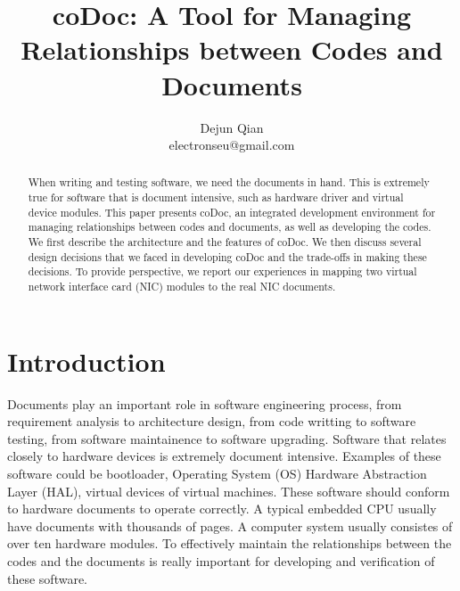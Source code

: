 \documentclass[11pt,letterpaper,oneside]{article}
\title{coDoc: A Tool for Managing Relationships between Codes and Documents}
\author{Dejun Qian\\electronseu@gmail.com}
\date{}
\begin{document}
\maketitle

\begin{abstract}
When writing and testing software, 
we need the documents in hand.
This is extremely true for software that is document intensive, 
such as hardware driver and virtual device modules.
This paper presents coDoc, 
an integrated development environment for managing relationships between codes and documents, as well as developing the codes. 
We first describe the architecture and the features of coDoc.
We then discuss several design decisions that we faced in developing coDoc and the trade-offs in making these decisions.
To provide perspective,
we report our experiences in mapping two virtual network interface card (NIC) modules to the real NIC documents.
\end{abstract}

\section{Introduction}
\label{sec:introduction}
Documents play an important role in software engineering process,
from requirement analysis to architecture design,
from code writting to software testing,
from software maintainence to software upgrading.
Software that relates closely to hardware devices is extremely document intensive.
Examples of these software could be bootloader, 
Operating System (OS) Hardware Abstraction Layer (HAL),
virtual devices of virtual machines.
These software should conform to hardware documents to operate correctly.
A typical embedded CPU usually have documents with thousands of pages.
A computer system usually consistes of over ten hardware modules.
To effectively maintain the relationships between the codes and the documents is really important for developing and verification of these software.
\end{document}
